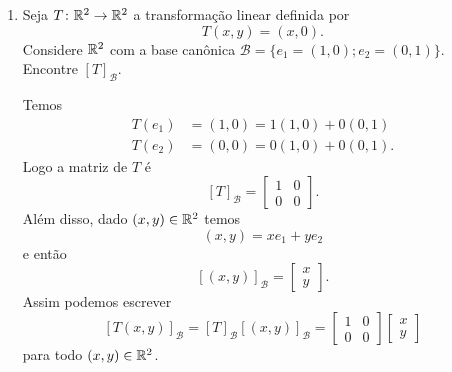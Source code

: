 \begin{exemplos}
  \begin{enumerate}[label={\arabic*})]
    \item Seja $T \colon \mathbb{R}^2 \to \mathbb{R}^2$ a transformação linear definida por
    \[
      T(x,y) = (x,0).
    \]
    Considere $\mathbb{R}^2$ com a base can\^onica $\mathcal{B} = \{e_1=(1,0);e_2=(0,1)\}$. Encontre $[T]_\mathcal{B}$.
    \begin{solucao}
      Temos
      \begin{align*}
        T(e_1) &= (1,0) = 1(1,0) + 0(0,1)\\
        T(e_2) &= (0,0) = 0(1,0) + 0(0,1).
      \end{align*}
      Logo a matriz de $T$ é
      \[
        [T]_\mathcal{B} = \begin{bmatrix}
          1 & 0\\
          0 & 0
        \end{bmatrix}.
      \]
      Além disso, dado $(x,y) \in \mathbb{R}^2$ temos
      \[
        (x,y) = xe_1 + ye_2
      \]
      e então
      \[
        [(x,y)]_\mathcal{B} = \begin{bmatrix}
          x\\y
        \end{bmatrix}.
      \]
      Assim podemos escrever
      \[
        [T(x,y)]_\mathcal{B} = [T]_\mathcal{B}[(x,y)]_\mathcal{B} = \begin{bmatrix}
          1 & 0\\
          0 & 0
        \end{bmatrix}\begin{bmatrix}
          x\\y
        \end{bmatrix}
      \]
      para todo $(x,y) \in \mathbb{R}^2$.
    \end{solucao}


\end{enumerate}
\end{exemplos}
